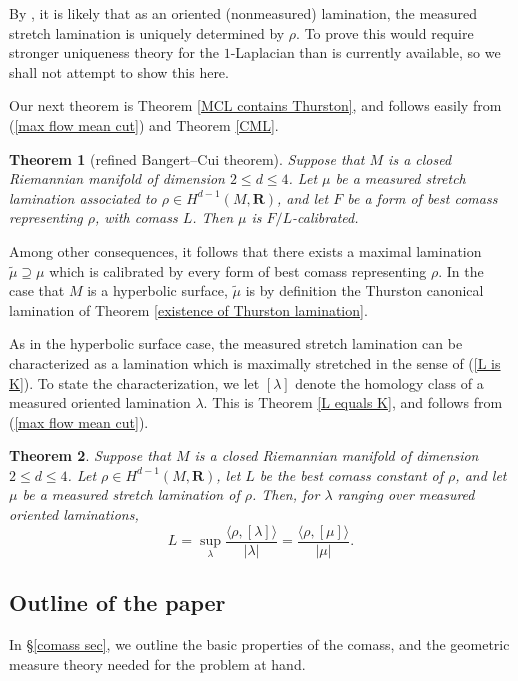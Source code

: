 \documentclass[reqno,11pt]{amsart}
\newcommand{\RR}{\mathbf{R}}
\newtheorem{mainthm}{Theorem}
\theoremstyle{definition}
\numberwithin{equation}{section}
\begin{document}
By \cite[Remark 2.8]{Mazon14}, it is likely that as an oriented (nonmeasured) lamination, the measured stretch lamination is uniquely determined by $\rho$.
To prove this would require stronger uniqueness theory for the $1$-Laplacian than is currently available, so we shall not attempt to show this here.

Our next theorem is Theorem \ref{MCL contains Thurston}, and follows easily from (\ref{max flow mean cut}) and Theorem \ref{CML}.

\begin{mainthm}[refined Bangert--Cui theorem]\label{lams are calibrated}
Suppose that $M$ is a closed Riemannian manifold of dimension $2 \leq d \leq 4$.
Let $\mu$ be a measured stretch lamination associated to $\rho \in H^{d - 1}(M, \RR)$, and let $F$ be a form of best comass representing $\rho$, with comass $L$.
Then $\mu$ is $F/L$-calibrated.
\end{mainthm}

Among other consequences, it follows that there exists a maximal lamination $\tilde \mu \supseteq \mu$ which is calibrated by every form of best comass representing $\rho$.
In the case that $M$ is a hyperbolic surface, $\tilde \mu$ is by definition the Thurston canonical lamination of Theorem \ref{existence of Thurston lamination}.

As in the hyperbolic surface case, the measured stretch lamination can be characterized as a lamination which is maximally stretched in the sense of (\ref{L is K}).
To state the characterization, we let $[\lambda]$ denote the homology class of a measured oriented lamination $\lambda$.
This is Theorem \ref{L equals K}, and follows from (\ref{max flow mean cut}).

\begin{mainthm}\label{LK}
Suppose that $M$ is a closed Riemannian manifold of dimension $2 \leq d \leq 4$.
Let $\rho \in H^{d - 1}(M, \RR)$, let $L$ be the best comass constant of $\rho$, and let $\mu$ be a measured stretch lamination of $\rho$. Then, for $\lambda$ ranging over measured oriented laminations,
$$L = \sup_\lambda \frac{\langle \rho, [\lambda]\rangle}{|\lambda|} = \frac{\langle \rho, [\mu]\rangle}{|\mu|}.$$
\end{mainthm}




\subsection{Outline of the paper}
In \S\ref{comass sec}, we outline the basic properties of the comass, and the geometric measure theory needed for the problem at hand.
\end{document}

